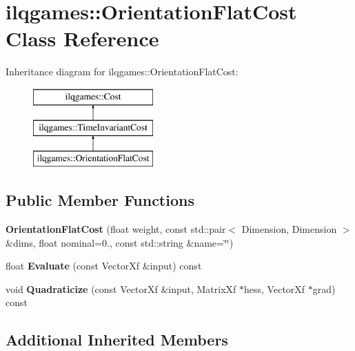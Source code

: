 \hypertarget{classilqgames_1_1_orientation_flat_cost}{}\section{ilqgames\+:\+:Orientation\+Flat\+Cost Class Reference}
\label{classilqgames_1_1_orientation_flat_cost}
Inheritance diagram for ilqgames\+:\+:Orientation\+Flat\+Cost\+:\begin{figure}[H]
\begin{center}
\leavevmode
\includegraphics[height=3.000000cm]{classilqgames_1_1_orientation_flat_cost}
\end{center}
\end{figure}
\subsection*{Public Member Functions}
\begin{DoxyCompactItemize}
\item 
{\bfseries Orientation\+Flat\+Cost} (float weight, const std\+::pair$<$ Dimension, Dimension $>$ \&dims, float nominal=0., const std\+::string \&name=\char`\"{}\char`\"{})\hypertarget{classilqgames_1_1_orientation_flat_cost_a9f888bd3236e120cc973a3cbe8c0cb13}{}\label{classilqgames_1_1_orientation_flat_cost_a9f888bd3236e120cc973a3cbe8c0cb13}

\item 
float {\bfseries Evaluate} (const Vector\+Xf \&input) const \hypertarget{classilqgames_1_1_orientation_flat_cost_a9c6ba86849f65fe7d3e1f8ac38cce9eb}{}\label{classilqgames_1_1_orientation_flat_cost_a9c6ba86849f65fe7d3e1f8ac38cce9eb}

\item 
void {\bfseries Quadraticize} (const Vector\+Xf \&input, Matrix\+Xf $\ast$hess, Vector\+Xf $\ast$grad) const \hypertarget{classilqgames_1_1_orientation_flat_cost_a4702648ebb52668d905e3d9d85b29397}{}\label{classilqgames_1_1_orientation_flat_cost_a4702648ebb52668d905e3d9d85b29397}

\end{DoxyCompactItemize}
\subsection*{Additional Inherited Members}


